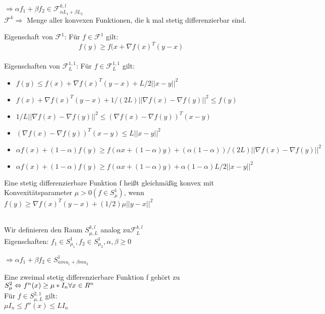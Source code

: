 $\Rightarrow \alpha f_1 + \beta f_2 \in \mathcal{F}_{\alpha L_1 + \beta L_2}^{k,l}$\\


$\mathcal{F}^k \Rightarrow$ Menge aller konvexen Funktionen, die k mal stetig differenzierbar sind.

Eigenschaft von $\mathcal{F}^1$: Für $f \in \mathcal{F}^1$ gilt:\\
\begin{equation}
	f(y) \geq f(x+ \nabla f(x)^T (y-x)
\end{equation}\\

Eigenschaften von $\mathcal{F}^{1,1}_L$: Für $f \in \mathcal{F}^{1,1}_L$ gilt:\\
\begin{itemize}
	\item $f(y) \leq f(x) + \nabla f(x)^T (y-x) + L/2 ||x-y||^2$
	\item $f(x) + \nabla f(x)^T (y-x) + 1/(2L) || \nabla f(x) - \nabla f(y)||^2 \leq f(y)$
	\item $ 1/L || \nabla f(x) - \nabla f(y)||^2 \leq (\nabla f(x) - \nabla f(y))^T (x-y)$
	\item $(\nabla f(x) - \nabla f(y))^T (x-y) \leq L ||x-y||^2$
	\item $ \alpha f(x) + (1-\alpha) f(y) \geq f(\alpha x + (1-\alpha)y) + (\alpha(1-\alpha))/(2L) || \nabla f(x) - \nabla f(y)||^2$
	\item $\alpha f(x) + (1-\alpha) f(y) \geq f(\alpha x + (1-\alpha)y) + \alpha (1-\alpha) L/2 ||x-y||^2$
\end{itemize}

\begin{Definition}
Eine stetig differenzierbare Funktion f heißt gleichmäßig konvex mit Konvexitätsparameter $\mu > 0 (f \in S_\mu^1)$, wenn $f(y) \geq \nabla f(x)^T (y-x) + (1/2) \mu ||y-x||^2 $
\end{Definition}\mbox{}\\ Wir definieren den Raum $S_{\mu,L}^{k,l}$ analog zu$ \mathcal{F}_L^{k,l} $\\
Eigenschaften:
$f_1 \in S_{\mu_1}^1, f_2 \in S_{\mu_2}^1, \alpha, \beta \geq 0 $

$\Rightarrow  \alpha f_1 + \beta f_2 \in S^{1}_{\alpha mu_1 + \beta mu_2}$


\begin{Lemma}
	Eine zweimal stetig differenzierbare Funktion f gehört zu $S^{2}_{\mu}\\
	 \Leftrightarrow f^n(x) \geq \mu*I_n  \forall x \in R^n$\\
Für $f \in S_{\mu,L}^{2,1}$ gilt:\\
$\mu I_n \leq f''(x) \leq L I_n$
\end{Lemma}

